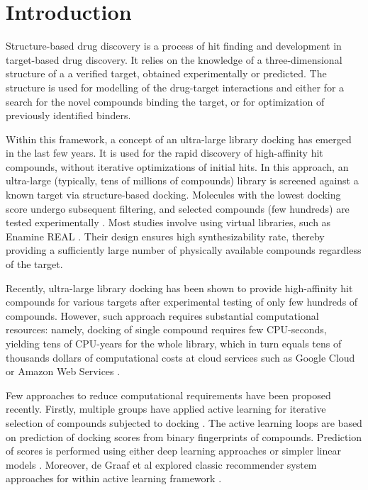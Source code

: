 \section{Introduction}

Structure-based drug discovery is a process of hit finding and development in target-based drug discovery. It relies on the knowledge of a three-dimensional structure of a a verified target, obtained experimentally or predicted. The structure is used for modelling of the drug-target interactions and either for a search for the novel compounds binding the target, or for optimization of previously identified binders.

Within this framework, a concept of an ultra-large library docking has emerged in the last few years. It is used for the rapid discovery of high-affinity hit compounds, without iterative optimizations of initial hits. In this approach, an ultra-large (typically, tens of millions of compounds) library is screened against a known target via structure-based docking. Molecules with the lowest docking score undergo subsequent filtering, and selected compounds (few hundreds) are tested experimentally \cite{bender_practical_2021}. Most studies involve using virtual libraries, such as Enamine REAL \cite{noauthor_real_nodate}. Their design ensures high synthesizability rate, thereby providing a sufficiently large number of physically available compounds regardless of the target.

Recently, ultra-large library docking has been shown to provide high-affinity hit compounds for various targets \cite{sigma2_paper, melatonin_paper, ultralarge_docking_first, gorgulla_open-source_2020, beroza_chemical_2022, noauthor_large_nodate, lu_structure-guided_2021, sadybekov_synthon-based_2022, sadybekov_structure-based_2020} after experimental testing of only few hundreds of compounds. However, such approach requires substantial computational resources: namely, docking of single compound requires few CPU-seconds, yielding tens of CPU-years for the whole library, which in turn equals tens of thousands dollars of computational costs at cloud services such as Google Cloud or Amazon Web Services \cite{irwin_large_2023,grebner_virtual_2020}.

Few approaches to reduce computational requirements have been proposed recently. Firstly, multiple groups have applied active learning for iterative selection of compounds subjected to docking \cite{Graff2021AcceleratingLearning,autoencoders_guided_learning,logistic_regression,deepdocking,leandocking,Yang2021_shoichet_active_learning}. The active learning loops are based on prediction of docking scores from binary fingerprints of compounds. Prediction of scores is performed using either deep learning approaches \cite{deepdocking,Yang2021_shoichet_active_learning,autoencoders_guided_learning, Graff2021AcceleratingLearning} or simpler linear models \cite{leandocking,logistic_regression}. Moreover, de Graaf et al explored classic recommender system approaches for within active learning framework \cite{Graff2021AcceleratingLearning}. 

